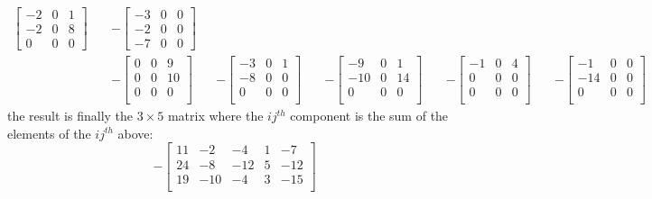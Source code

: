 \documentclass{article}
\begin{document}
\[\begin{aligned}
\begin{bmatrix}
			    -2 & 0 & 1 \\
			    -2 & 0 & 8 \\
			    0  & 0 & 0
		    \end{bmatrix}
		\quad
		 & -\begin{bmatrix}
			    -3 & 0 & 0 \\
			    -2 & 0 & 0 \\
			    -7 & 0 & 0
		    \end{bmatrix}
		\\
		 & -\begin{bmatrix}
			    0 & 0 & 9  \\
			    0 & 0 & 10 \\
			    0 & 0 & 0  \\
		    \end{bmatrix}
		\quad
		 & -\begin{bmatrix}
			    -3 & 0 & 1 \\
			    -8 & 0 & 0 \\
			    0  & 0 & 0 \\
		    \end{bmatrix}
		\quad
		 & -\begin{bmatrix}
			    -9  & 0 & 1  \\
			    -10 & 0 & 14 \\
			    0   & 0 & 0  \\
		    \end{bmatrix}
		\quad
		 & -\begin{bmatrix}
			    -1 & 0 & 4 \\
			    0  & 0 & 0 \\
			    0  & 0 & 0 \\
		    \end{bmatrix}
		\quad
		 & -\begin{bmatrix}
			    -1  & 0 & 0 \\
			    -14 & 0 & 0 \\
			    0   & 0 & 0 \\
		    \end{bmatrix}
	\end{aligned}
\]
the result is finally the $3 \times 5$ matrix where the $ij^{th}$ component is the sum of the elements of the $ij^{th}$ above:
\[
	-\begin{bmatrix}
		11 & -2  & -4  & 1 & -7  \\
		24 & -8  & -12 & 5 & -12 \\
		19 & -10 & -4  & 3 & -15 \\
	\end{bmatrix}
\]
\end{document}
